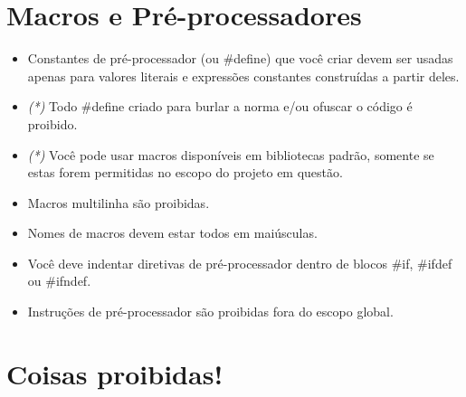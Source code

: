 \documentclass{42-pt}
\begin{document}
    \section{Macros e Pré-processadores}

      \begin{itemize}

          \item Constantes de pré-processador (ou \#define) que você criar devem ser usadas
              apenas para valores literais e expressões constantes construídas a partir deles.
          \item \textit{(*)} Todo \#define criado para burlar a norma e/ou ofuscar
              o código é proibido.
          \item \textit{(*)} Você pode usar macros disponíveis em bibliotecas padrão, somente
              se estas forem permitidas no escopo do projeto em questão.
          \item Macros multilinha são proibidas.
          \item Nomes de macros devem estar todos em maiúsculas.
          \item Você deve indentar diretivas de pré-processador dentro de blocos \#if, \#ifdef
              ou \#ifndef.
          \item Instruções de pré-processador são proibidas fora do escopo global.

      \end{itemize}
      \newpage


    \section{Coisas proibidas!}
\end{document}
